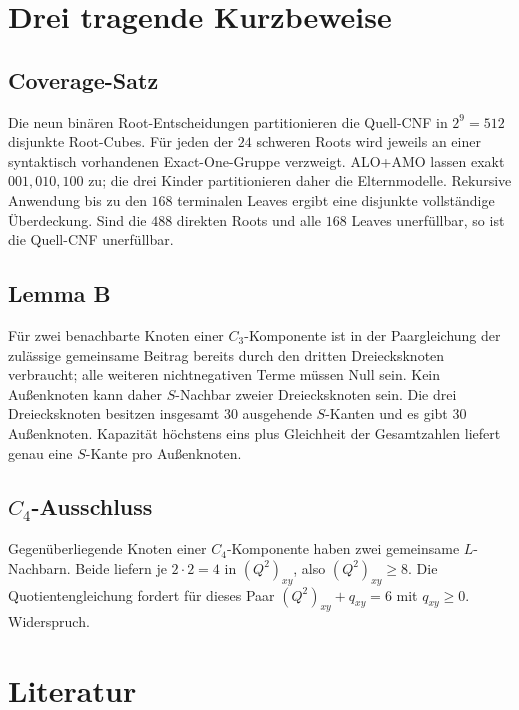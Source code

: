 \documentclass[11pt,a4paper]{article}
\begin{document}
\appendix

\section{Drei tragende Kurzbeweise}

\subsection{Coverage-Satz}

Die neun binären Root-Entscheidungen partitionieren die Quell-CNF in $2^9=512$ disjunkte Root-Cubes. Für jeden der $24$ schweren Roots wird jeweils an einer syntaktisch vorhandenen Exact-One-Gruppe verzweigt. ALO+AMO lassen exakt $001,010,100$ zu; die drei Kinder partitionieren daher die Elternmodelle. Rekursive Anwendung bis zu den $168$ terminalen Leaves ergibt eine disjunkte vollständige Überdeckung. Sind die $488$ direkten Roots und alle $168$ Leaves unerfüllbar, so ist die Quell-CNF unerfüllbar.

\subsection{Lemma B}

Für zwei benachbarte Knoten einer $C_3$-Komponente ist in der Paargleichung der zulässige gemeinsame Beitrag bereits durch den dritten Dreiecksknoten verbraucht; alle weiteren nichtnegativen Terme müssen Null sein. Kein Außenknoten kann daher $S$-Nachbar zweier Dreiecksknoten sein. Die drei Dreiecksknoten besitzen insgesamt $30$ ausgehende $S$-Kanten und es gibt $30$ Außenknoten. Kapazität höchstens eins plus Gleichheit der Gesamtzahlen liefert genau eine $S$-Kante pro Außenknoten.

\subsection{$C_4$-Ausschluss}

Gegenüberliegende Knoten einer $C_4$-Komponente haben zwei gemeinsame $L$-Nachbarn. Beide liefern je $2\cdot2=4$ in $(Q^2)_{xy}$, also $(Q^2)_{xy}\ge8$. Die Quotientengleichung fordert für dieses Paar $(Q^2)_{xy}+q_{xy}=6$ mit $q_{xy}\ge0$. Widerspruch.

\section{Literatur}
\end{document}
